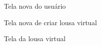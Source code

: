 \begin{figure}[H]
  \centering
  \caption{Tela nova do usuário}\label{figura:indexNovo}
\end{figure}

\begin{figure}[H]
  \centering
  \caption{Tela nova de criar lousa virtual}\label{figura:criarNovo}
\end{figure}

\begin{figure}[H]
  \centering
  \caption{Tela da lousa virtual}\label{figura:Retrospectiva}
\end{figure}

